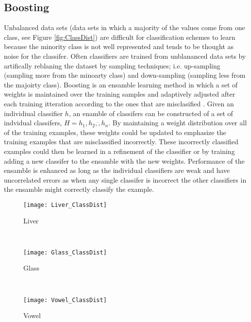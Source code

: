 \subsection{Boosting}
Unbalanced data sets (data sets in which a majority of the values come from one class, see Figure \ref{fig:ClassDist}) are difficult for classification schemes to learn because the minority class is not well represented and tends to be thought as noise for the classifer.
Often classifiers are trained from unblananced data sets by artifically reblaning the dataset by sampling techniques; i.e. up-sampling (sampling more from the minoarty class) and down-sampling (sampling less from the majoirty class).
Boosting is an ensamble learning method in which a set of weights is maintained over the training samples and adaptively adjusted after each training itteration according to the ones that are misclasified \cite{li_adaboost_2008}.
Given an individiual classifier $h$, an enamble of classifers can be constructed of a set of indvidual classifers, $H={h_1, h_2,\dot, h_n}$.
By maintaining a weight distribution over all of the training examples, these weights could be updated to emphasize the training examples that are misclassified incorrectly.  These incorrectly classified examples could then be learned in a refinement of the classifier or by training adding a new classifer to the ensamble with the new weights.
Performance of the ensamble is enhanced as long as the individual classifiers are weak and have uncorrelated errors as when any single classifer is incorrect the other classifiers in the ensamble might correctly classify the example.
\begin{figure*}[ht!]
	\centering
	\begin{subfigure}[b]{0.3\textwidth}
		\centering
		\texttt{[image: Liver\_ClassDist]}
        \caption{Liver}
	\end{subfigure}%
	~
	\begin{subfigure}[b]{0.3\textwidth}
		\centering
		\texttt{[image: Glass\_ClassDist]}
        \caption{Glass}
	\end{subfigure}	
    ~
	\begin{subfigure}[b]{0.3\textwidth}
		\centering
		\texttt{[image: Vowel\_ClassDist]}
        \caption{Vowel}
	\end{subfigure}%
	\caption{Distribution of Class Data}
	\label{fig:ClassDist}
\end{figure*}
